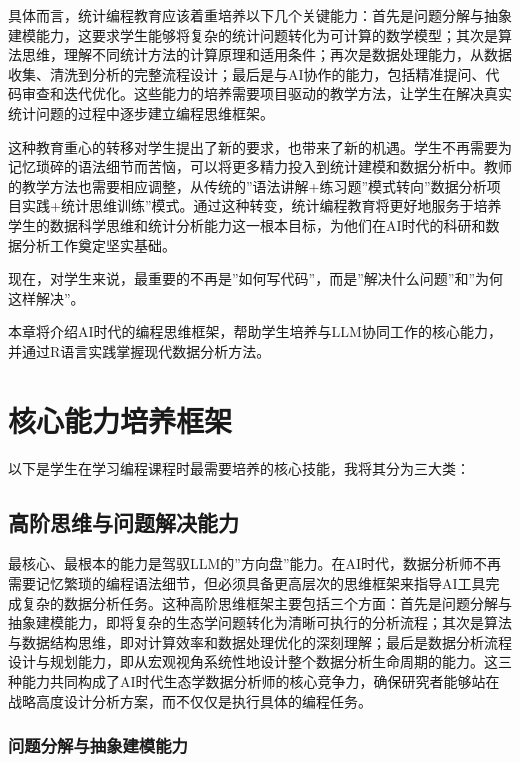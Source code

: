 \documentclass[
]{book}
\begin{document}
具体而言，统计编程教育应该着重培养以下几个关键能力：首先是问题分解与抽象建模能力，这要求学生能够将复杂的统计问题转化为可计算的数学模型；其次是算法思维，理解不同统计方法的计算原理和适用条件；再次是数据处理能力，从数据收集、清洗到分析的完整流程设计；最后是与AI协作的能力，包括精准提问、代码审查和迭代优化。这些能力的培养需要项目驱动的教学方法，让学生在解决真实统计问题的过程中逐步建立编程思维框架。

这种教育重心的转移对学生提出了新的要求，也带来了新的机遇。学生不再需要为记忆琐碎的语法细节而苦恼，可以将更多精力投入到统计建模和数据分析中。教师的教学方法也需要相应调整，从传统的''语法讲解+练习题''模式转向''数据分析项目实践+统计思维训练''模式。通过这种转变，统计编程教育将更好地服务于培养学生的数据科学思维和统计分析能力这一根本目标，为他们在AI时代的科研和数据分析工作奠定坚实基础。

现在，对学生来说，最重要的不再是''如何写代码''，而是''解决什么问题''和''为何这样解决''。

本章将介绍AI时代的编程思维框架，帮助学生培养与LLM协同工作的核心能力，并通过R语言实践掌握现代数据分析方法。

\hypertarget{ux6838ux5fc3ux80fdux529bux57f9ux517bux6846ux67b6}{%
\section{核心能力培养框架}\label{ux6838ux5fc3ux80fdux529bux57f9ux517bux6846ux67b6}}

以下是学生在学习编程课程时最需要培养的核心技能，我将其分为三大类：

\hypertarget{ux9ad8ux9636ux601dux7ef4ux4e0eux95eeux9898ux89e3ux51b3ux80fdux529b}{%
\subsection{高阶思维与问题解决能力}\label{ux9ad8ux9636ux601dux7ef4ux4e0eux95eeux9898ux89e3ux51b3ux80fdux529b}}

最核心、最根本的能力是驾驭LLM的''方向盘''能力。在AI时代，数据分析师不再需要记忆繁琐的编程语法细节，但必须具备更高层次的思维框架来指导AI工具完成复杂的数据分析任务。这种高阶思维框架主要包括三个方面：首先是问题分解与抽象建模能力，即将复杂的生态学问题转化为清晰可执行的分析流程；其次是算法与数据结构思维，即对计算效率和数据处理优化的深刻理解；最后是数据分析流程设计与规划能力，即从宏观视角系统性地设计整个数据分析生命周期的能力。这三种能力共同构成了AI时代生态学数据分析师的核心竞争力，确保研究者能够站在战略高度设计分析方案，而不仅仅是执行具体的编程任务。

\hypertarget{ux95eeux9898ux5206ux89e3ux4e0eux62bdux8c61ux5efaux6a21ux80fdux529b}{%
\subsubsection{问题分解与抽象建模能力}\label{ux95eeux9898ux5206ux89e3ux4e0eux62bdux8c61ux5efaux6a21ux80fdux529b}}
\end{document}
